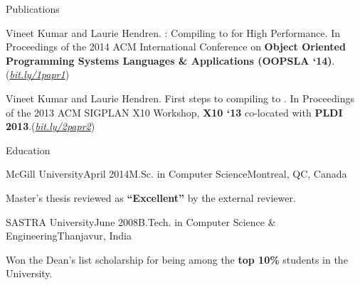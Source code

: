 \documentclass{resume} %
\begin{document}

\begin{rSection}{Publications}
\smallskip
\begin{lSubsection}


\item Vineet Kumar and Laurie Hendren. \mixten: Compiling \matlab to \xten for
	High Performance. In Proceedings of the 2014 ACM International
	Conference on \textbf{Object Oriented Programming Systems Languages \&
	Applications (OOPSLA
	`14)}.(\href{http://bit.ly/1papr1}{\em{bit.ly/1papr1}})

%
\item Vineet Kumar and Laurie Hendren. First steps to compiling \matlab to
	\xten. In Proceedings of the 2013 ACM SIGPLAN X10 Workshop, \textbf{X10
	`13} co-located with \textbf{PLDI
	2013}.(\href{http://bit.ly/2papr2}{\em{bit.ly/2papr2}})
\end{lSubsection}
\end{rSection}

 
\begin{rSection}{Education}

\begin{rSubsection}{McGill University}{April 2014}{M.Sc. in
Computer Science}{Montreal, QC, Canada} 
\item Master's thesis reviewed as \textbf{``Excellent''} by the external
reviewer.
\end{rSubsection}

\begin{rSubsection}{SASTRA University}{June 2008}{B.Tech. in Computer Science
\& Engineering}{Thanjavur, India} 
\item Won the {Dean's list scholarship} for being among the \textbf{top
10\%} students in the University. 
\end{rSubsection}

\end{rSection}
\end{document}
